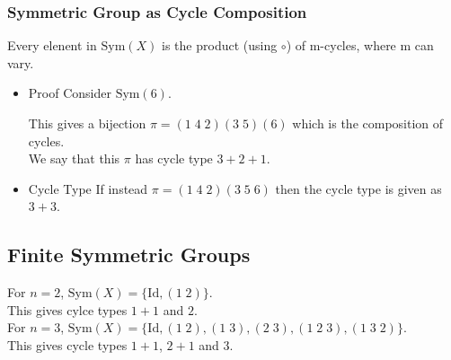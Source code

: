 \documentclass[11pt]{article}
\newcommand{\0}{\emptyset}
\begin{document}
\subsubsection*{Symmetric Group as Cycle Composition}
\label{sec:org1921585}
Every elenent in \(\text{Sym}(X)\) is the product (using \(\circ\)) of m-cycles, where m can vary.\\[0pt]
\begin{itemize}
\item Proof
\label{sec:org98d62b8}
Consider \(\text{Sym}(6)\).\\[0pt]
This gives a bijection \(\pi = (1\;4\;2)(3\;5)(6)\) which is the composition of cycles.\\[0pt]
We say that this \(\pi\) has cycle type \(3+2+1\).\\[0pt]
\item Cycle Type
\label{sec:org335e534}
If instead \(\pi=(1\;4\;2)(3\;5\;6)\) then the cycle type is given as \(3+3\).\\[0pt]
\end{itemize}
\subsection*{Finite Symmetric Groups}
\label{sec:orgbd3bc00}
For \(n=2\), \(\text{Sym}(X)=\{\text{Id},(1\;2)\}\).\\[0pt]
This gives cylce types \(1+1\) and \(2\).\\[0pt]
For \(n=3\), \(\text{Sym}(X)=\{\text{Id},(1\;2),(1\;3),(2\;3),(1\;2\;3),(1\;3\;2)\}\).\\[0pt]
This gives cycle types \(1+1\), \(2+1\) and \(3\).\\[0pt]
\end{document}
